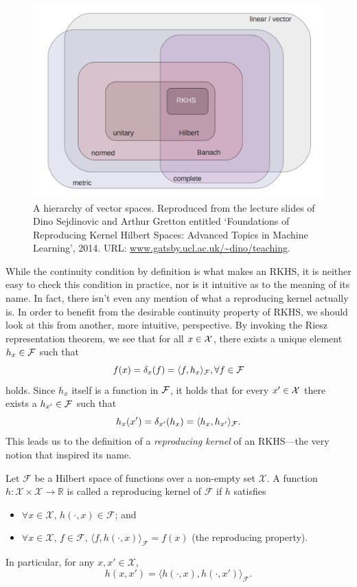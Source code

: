 \begin{figure}[hbt]
  \centering
  \includegraphics[scale=0.22]{figure/hierarchy-spaces.png}
  \caption{A hierarchy of vector spaces. Reproduced from the lecture slides of Dino Sejdinovic and Arthur Gretton entitled `Foundations of Reproducing Kernel Hilbert Spaces: Advanced Topics in Machine Learning', 2014. URL: \url{www.gatsby.ucl.ac.uk/~dino/teaching}.}
\end{figure}

While the continuity condition by definition is what makes an RKHS, it is neither easy to check this condition in practice, nor is it intuitive as to the meaning of its name.
In fact, there isn't even any mention of what a reproducing kernel actually is.
In order to benefit from the desirable continuity property of RKHS, we should look at this from another, more intuitive, perspective. 
By invoking the Riesz representation theorem, we see that for all $x\in{\mathcal X}$, there exists a unique element $h_x\in{\mathcal F}$ such that
\[
  f(x) = \delta_x(f) = \langle f,h_x\rangle_{\mathcal F}, \forall f \in {\mathcal F}
\]
holds. 
Since $h_x$ itself is a function in ${\mathcal F}$, it holds that for every $x' \in {\mathcal X}$ there exists a $h_{x'}\in{\mathcal F}$ such that
\[
  h_{x}(x') = \delta_{x'}(h_{x}) = \langle h_x,h_{x'}\rangle_{\mathcal F}.
\]
This leads us to the definition of a \emph{reproducing kernel} of an RKHS---the very notion that inspired its name.

\begin{definition}\label{def:repkern}
  Let $\mathcal F$ be a Hilbert space of functions over a non-empty set $\mathcal X$. A function $h:\mathcal X\times\mathcal X\rightarrow\mathbb R$ is called a reproducing kernel of $\mathcal F$ if $h$ satisfies
  \begin{itemize}
    \item $\forall x \in \mathcal X,\, h(\cdot, x) \in \mathcal F$; and
    \item $\forall x \in \mathcal X, \, f \in \mathcal F, \, \langle f, h(\cdot, x) \rangle_{\mathcal F} = f(x)$ (the reproducing property).
  \end{itemize}
  In particular, for any $x, x' \in \mathcal X$,
  \[
  	h(x,x') = \langle h(\cdot, x), h(\cdot, x') \rangle_{\mathcal F}.
  \]
\end{definition}

